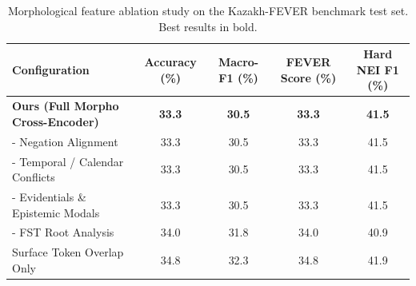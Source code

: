 \begin{table}[ht]
\centering
\small
\caption{Morphological feature ablation study on the Kazakh-FEVER benchmark test set. Best results in bold.}
\label{tab:ablation_results}
\begin{tabular}{lcccc}
\toprule
\textbf{Configuration} & \textbf{Accuracy (\%)} & \textbf{Macro-F1 (\%)} & \textbf{FEVER Score (\%)} & \textbf{Hard NEI F1 (\%)} \\
\midrule
\textbf{Ours (Full Morpho Cross-Encoder)} & \textbf{33.3} & \textbf{30.5} & \textbf{33.3} & \textbf{41.5} \\
\midrule
- Negation Alignment & 33.3 & 30.5 & 33.3 & 41.5 \\
- Temporal / Calendar Conflicts & 33.3 & 30.5 & 33.3 & 41.5 \\
- Evidentials \& Epistemic Modals & 33.3 & 30.5 & 33.3 & 41.5 \\
- FST Root Analysis & 34.0 & 31.8 & 34.0 & 40.9 \\
Surface Token Overlap Only & 34.8 & 32.3 & 34.8 & 41.9 \\
\bottomrule
\end{tabular}
\end{table}
